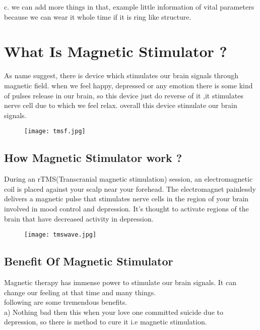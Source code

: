 \documentclass[12pt]{article}
\begin{document}
c. we can add more things in that, example little information of vital parameters because we can wear it whole time if it is ring like structure. 

\clearpage


\section{What Is Magnetic Stimulator ?}

As name suggest, there is device which stimulates our brain signals through magnetic field. when we feel happy, depressed or any emotion there is some kind of pulses release in our brain, so this device just do reverse of it ,it stimulates nerve cell due to which we feel relax.
overall this device stimulate our brain signals.

\begin{figure}[h]
\centering
\texttt{[image: tmsf.jpg]}
\end{figure}


\subsection{How Magnetic Stimulator work ?}

During an rTMS(Transcranial magnetic stimulation) session, an electromagnetic coil is placed against your scalp near your forehead. The electromagnet painlessly delivers a magnetic pulse that stimulates nerve cells in the region of your brain involved in mood control and depression. It's thought to activate regions of the brain that have decreased activity in depression. 

\begin{figure}[h]
\centering
\texttt{[image: tmswave.jpg]}
\end{figure}





\subsection{Benefit Of Magnetic Stimulator}

Magnetic therapy has immense power to stimulate our brain signals. It can change our feeling at that time and many things.\\
following are some tremendous benefits.\\



      a) Nothing bad then this when your love one committed suicide due to depression, so there is method to cure it i.e magnetic stimulation.\\
\end{document}
